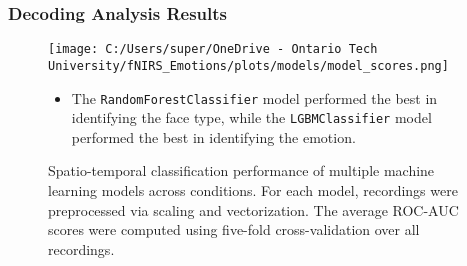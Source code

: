 \documentclass{beamer}
\begin{document}
\begin{frame}
    \frametitle{Decoding Analysis Results}
    \begin{figure}
        \texttt{[image: C:/Users/super/OneDrive - Ontario Tech University/fNIRS\_Emotions/plots/models/model\_scores.png]}
        \caption{Spatio-temporal classification performance of multiple machine learning models across conditions. For each model, recordings were preprocessed via scaling and vectorization. The average ROC-AUC scores were computed using five-fold cross-validation over all recordings. }
        \begin{itemize}
            \item The \texttt{RandomForestClassifier} model performed the best in identifying the face type, while the \texttt{LGBMClassifier} model performed the best in identifying the emotion.
        \end{itemize}
    \end{figure}
\end{frame}
\end{document}

